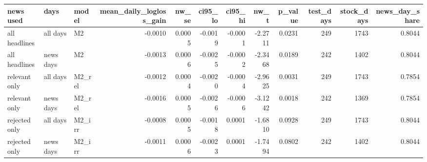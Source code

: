 \begin{tabular}{lllrrrrrrrrr}
\toprule
news used & days & model & mean\_daily\_logloss\_gain & nw\_se & ci95\_lo & ci95\_hi & nw\_t & p\_value & test\_days & stock\_days & news\_day\_share \\
\midrule
all headlines & all days & M2 & -0.0010 & 0.0005 & -0.0019 & -0.0001 & -2.2711 & 0.0231 & 249 & 1743 & 0.8044 \\
all headlines & news days & M2 & -0.0013 & 0.0006 & -0.0025 & -0.0002 & -2.3468 & 0.0189 & 242 & 1402 & 0.8044 \\
relevant only & all days & M2\_rel & -0.0012 & 0.0004 & -0.0020 & -0.0004 & -2.9625 & 0.0031 & 249 & 1743 & 0.7854 \\
relevant only & news days & M2\_rel & -0.0016 & 0.0005 & -0.0026 & -0.0006 & -3.1242 & 0.0018 & 242 & 1369 & 0.7854 \\
rejected only & all days & M2\_irr & -0.0008 & 0.0005 & -0.0018 & 0.0001 & -1.6810 & 0.0928 & 249 & 1743 & 0.8044 \\
rejected only & news days & M2\_irr & -0.0011 & 0.0006 & -0.0023 & 0.0001 & -1.7494 & 0.0802 & 242 & 1402 & 0.8044 \\
\bottomrule
\end{tabular}
